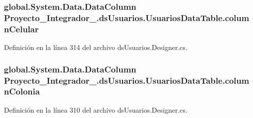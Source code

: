 \hypertarget{class_proyecto___integrador__3_1_1ds_usuarios_1_1_usuarios_data_table_a7e1f21c13b4fa270894a5cd7b1e4a771}{
\subsubsection[{column\-Celular}]{\setlength{\rightskip}{0pt plus 5cm}global.\-System.\-Data.\-Data\-Column Proyecto\-\_\-\-Integrador\-\_.\-ds\-Usuarios.\-Usuarios\-Data\-Table.\-column\-Celular\hspace{0.3cm}{\ttfamily [private]}}}\label{class_proyecto___integrador__3_1_1ds_usuarios_1_1_usuarios_data_table_a7e1f21c13b4fa270894a5cd7b1e4a771}


Definición en la línea 314 del archivo ds\-Usuarios.\-Designer.\-cs.

\hypertarget{class_proyecto___integrador__3_1_1ds_usuarios_1_1_usuarios_data_table_a084b4a14639a4288451f402641cb4023}{
\subsubsection[{column\-Colonia}]{\setlength{\rightskip}{0pt plus 5cm}global.\-System.\-Data.\-Data\-Column Proyecto\-\_\-\-Integrador\-\_.\-ds\-Usuarios.\-Usuarios\-Data\-Table.\-column\-Colonia\hspace{0.3cm}{\ttfamily [private]}}}\label{class_proyecto___integrador__3_1_1ds_usuarios_1_1_usuarios_data_table_a084b4a14639a4288451f402641cb4023}


Definición en la línea 310 del archivo ds\-Usuarios.\-Designer.\-cs.


